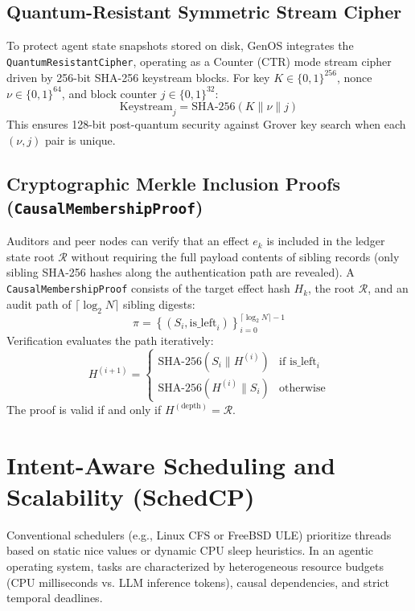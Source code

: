 \documentclass[10pt,journal,compsoc]{IEEEtran}
\theoremstyle{definition}
\begin{document}
\subsection{Quantum-Resistant Symmetric Stream Cipher}
To protect agent state snapshots stored on disk, GenOS integrates the \texttt{QuantumResistantCipher}, operating as a Counter (CTR) mode stream cipher driven by 256-bit SHA-256 keystream blocks. For key $K \in \{0,1\}^{256}$, nonce $\nu \in \{0,1\}^{64}$, and block counter $j \in \{0,1\}^{32}$:
$$\text{Keystream}_j = \text{SHA-256}(K \parallel \nu \parallel j)$$
This ensures 128-bit post-quantum security against Grover key search when each $(\nu, j)$ pair is unique.

\subsection{Cryptographic Merkle Inclusion Proofs (\texttt{CausalMembershipProof})}
Auditors and peer nodes can verify that an effect $e_k$ is included in the ledger state root $\mathcal{R}$ without requiring the full payload contents of sibling records (only sibling SHA-256 hashes along the authentication path are revealed).
A \texttt{CausalMembershipProof} consists of the target effect hash $H_k$, the root $\mathcal{R}$, and an audit path of $\lceil \log_2 N \rceil$ sibling digests:
$$\pi = \left\{ (S_i, \text{is\_left}_i) \right\}_{i=0}^{\lceil \log_2 N \rceil - 1}$$
Verification evaluates the path iteratively:
$$H^{(i+1)} = \begin{cases} \text{SHA-256}(S_i \parallel H^{(i)}) & \text{if } \text{is\_left}_i \\ \text{SHA-256}(H^{(i)} \parallel S_i) & \text{otherwise} \end{cases}$$
The proof is valid if and only if $H^{(\text{depth})} = \mathcal{R}$.

\section{Intent-Aware Scheduling and Scalability (SchedCP)}
\label{sec:sched}

Conventional schedulers (e.g., Linux CFS or FreeBSD ULE) prioritize threads based on static nice values or dynamic CPU sleep heuristics. In an agentic operating system, tasks are characterized by heterogeneous resource budgets (CPU milliseconds vs. LLM inference tokens), causal dependencies, and strict temporal deadlines.
\end{document}
